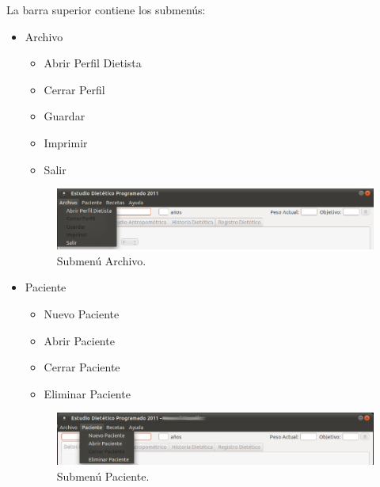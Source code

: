 La barra superior contiene los submenús:
\begin{itemize}
\item Archivo
\begin{itemize}
\item Abrir Perfil Dietista
\item Cerrar Perfil
\item Guardar
\item Imprimir
\item Salir
\end{itemize}

\begin{figure}[H]
  \label{archivo}
  \begin{center}
    \includegraphics[scale=0.5]{../../Image/archivo-barra.png}
  \end{center}
  \caption{Submenú Archivo.}
\end{figure}

\item Paciente
\begin{itemize}
\item Nuevo Paciente
\item Abrir Paciente
\item Cerrar Paciente
\item Eliminar Paciente
\end{itemize}

\begin{figure}[H]
  \label{paciente}
  \begin{center}
    \includegraphics[scale=0.5]{../../Image/paciente-barra.png} 
  \end{center}
  \caption{Submenú Paciente.}
\end{figure}


\end{itemize}
